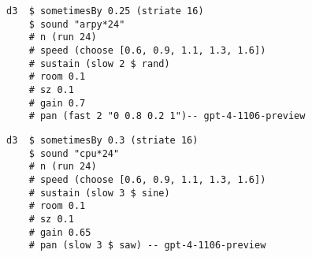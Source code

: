 \begin{minipage}[t]{1\textwidth}
    \centering
    \begin{lstlisting}[style=SuperCollider-IDE, language=ExtendedHaskell, basicstyle=\footnotesize\ttfamily, numbers=none]
d3  $ sometimesBy 0.25 (striate 16) 
    $ sound "arpy*24" 
    # n (run 24) 
    # speed (choose [0.6, 0.9, 1.1, 1.3, 1.6]) 
    # sustain (slow 2 $ rand) 
    # room 0.1 
    # sz 0.1 
    # gain 0.7 
    # pan (fast 2 "0 0.8 0.2 1")-- gpt-4-1106-preview                                
    \end{lstlisting}
    \vspace{1cm}
\end{minipage}










\begin{minipage}[t]{1\textwidth}
    \centering
    \begin{lstlisting}[style=SuperCollider-IDE, language=ExtendedHaskell, basicstyle=\footnotesize\ttfamily, numbers=none]
d3  $ sometimesBy 0.3 (striate 16) 
    $ sound "cpu*24" 
    # n (run 24) 
    # speed (choose [0.6, 0.9, 1.1, 1.3, 1.6]) 
    # sustain (slow 3 $ sine) 
    # room 0.1 
    # sz 0.1 
    # gain 0.65 
    # pan (slow 3 $ saw) -- gpt-4-1106-preview                          
    \end{lstlisting}
    \vspace{1cm}
\end{minipage}











